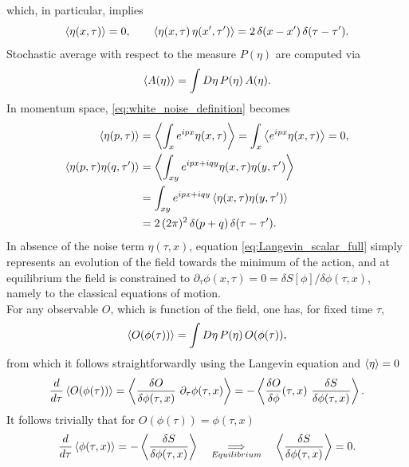 which, in particular, implies
\begin{equation}
    \left\langle \eta(x,\tau) \right\rangle = 0, \qquad \left\langle \eta(x,\tau) \, \eta(x',\tau') \right\rangle = 2 \, \delta(x - x') \, \delta (\tau - \tau').
    \label{eq:white_noise_definition}
\end{equation}
Stochastic average with respect to the measure $P(\eta)$ are computed via 
\begin{equation*}
    \left\langle A(\eta) \right\rangle = \int D\eta \, P(\eta) \, A(\eta).
\end{equation*}
In momentum space, \eqref{eq:white_noise_definition} becomes
\begin{equation}
    \begin{aligned}
        \left\langle \eta(p,\tau) \right\rangle &= \left\langle \int_x e^{ipx}\eta(x,\tau) \right\rangle = \int_x \left\langle e^{ipx}\eta(x,\tau) \right\rangle = 0, \\
        \left\langle \eta(p,\tau)\eta(q,\tau') \right\rangle &= \left\langle \int_{xy} e^{ipx + iqy} \eta(x,\tau)\eta(y,\tau') \right\rangle \\
        &= \int_{xy} e^{ipx + iqy} \left\langle \eta(x,\tau)\eta(y,\tau') \right\rangle \\
        &= 2 \, (2\pi)^2 \, \delta(p + q) \, \delta(\tau - \tau').
    \end{aligned}
    \label{eq:white_noise_definition_momentum}
\end{equation}
In absence of the noise term $\eta(\tau,x)$, equation \eqref{eq:Langevin_scalar_full} simply represents an evolution of the field towards the minimum of the action, and at equilibrium the field is constrained to $\partial_\tau \phi(x,\tau) = 0 = \delta S[\phi]/\delta \phi (\tau, x)$, namely to the classical equations of motion.\\
For any observable $O$, which is function of the field, one has, for fixed time $\tau$,
\begin{equation*}
    \left\langle O(\phi(\tau)) \right\rangle = \int D\eta \, P(\eta) \, O(\phi(\tau)),
\end{equation*}
from which it follows straightforwardly using the Langevin equation and $\left\langle \eta \right\rangle = 0$
\begin{equation*}
    \frac{d}{d\tau} \left\langle O(\phi(\tau)) \right\rangle = \left\langle \frac{\delta O}{\delta \phi(\tau, x)} \ \partial_\tau \phi(\tau, x) \right\rangle = -\left\langle \frac{\delta O}{\delta \phi}(\tau, x) \ \frac{\delta S}{\delta \phi(\tau, x)} \right\rangle.
\end{equation*}
It follows trivially that for $O(\phi(\tau)) = \phi(\tau, x)$
\begin{equation*}
        \frac{d}{d\tau} \left\langle \phi(\tau, x) \right\rangle = -\left\langle \frac{\delta S}{\delta \phi(\tau, x)} \right\rangle \quad \underset{Equilibrium}{\Longrightarrow} \quad \left\langle \frac{\delta S}{\delta \phi(\tau, x)} \right\rangle = 0.
\end{equation*}
